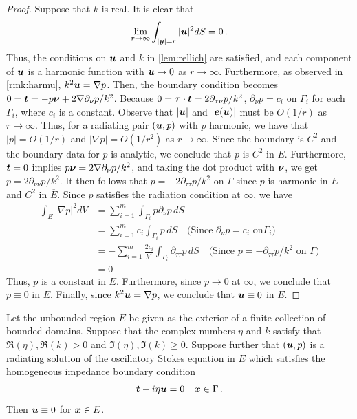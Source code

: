 \begin{proof}
Suppose that $k$ is real. It is clear that
\begin{equation}
\lim_{r\to\infty} \int_{|{\boldsymbol y}|=r} |{\boldsymbol u}|^2 dS = 0 \, . \nonumber
\end{equation}
Thus, the conditions on ${\boldsymbol u}$ and $k$ in \cref{lem:rellich}
are satisfied, and each component of ${\boldsymbol u}$ is a harmonic function
with ${\boldsymbol u} \to 0$ as $r \to \infty$. Furthermore, as observed
in \cref{rmk:harmu}, $k^2 {\boldsymbol u} = \nabla p$. Then, the boundary
condition becomes $0 = {\boldsymbol t} = -p {\boldsymbol \nu} + 2 \nabla \partial_\nu p/k^2$.
Because $0 = {\boldsymbol \tau} \cdot {\boldsymbol t} = 2\partial_{\tau\nu} p/k^2$,
$\partial_\nu p  = c_{i}$ on $\Gamma_{i}$ for each $\Gamma_{i}$,
where $c_{i}$ is a constant. 
Observe that $|{\boldsymbol u}|$ and $|{\boldsymbol e}({\boldsymbol u})|$ must be $O(1/r)$ as
$r\to\infty$. Thus,
for a radiating pair $({\boldsymbol u},p)$ with $p$ harmonic,
we have that $|p| = O(1/r)$ and $|\nabla p| = O(1/r^2)$
as $r\to\infty$.
Since the boundary is $C^{2}$ and the boundary data for $p$
is analytic, we conclude that $p$ is $C^{2}$ in
$\overline{E}$.
Furthermore, ${\boldsymbol t}=0$ implies $p {\boldsymbol \nu} = 2\nabla \partial_{\nu} p/k^2$, 
and taking the dot
product with ${\boldsymbol \nu}$, we get
$p = 2\partial_{\nu \nu}p/k^2$. 
It then follows that
$p = -2\partial_{\tau \tau}p/k^2$ on $\Gamma$ since 
$p$ is harmonic in $E$ and $C^{2}$ in $\overline{E}$. 
Since $p$ satisfies the radiation condition at $\infty$,
we have
\begin{equation}
\begin{aligned}
\int_{E} |\nabla p|^2 dV &= 
\sum_{i=1}^{m} \int_{\Gamma_{i}} p \partial_{\nu}p \,dS \\
&= \sum_{i=1}^{m} c_{i} \int_{\Gamma_{i}} p \,dS \quad \text{(Since $\partial_{\nu} p = c_{i}$ on
$\Gamma_{i}$)} \\ 
&= -\sum_{i=1}^{m} \frac{2c_{i}}{k^2} \int_{\Gamma_{i}} \partial_{\tau \tau} p \,dS 
\quad \text{(Since $p = -\partial_{\tau \tau}p/k^2$ on $\Gamma$)} \\
&= 0
\end{aligned}
\end{equation}
Thus, $p$ is a constant in $E$. Furthermore, since $p\to 0$ at $\infty$, 
we conclude that $p\equiv 0$ in $E$. 
Finally, since $k^2 {\boldsymbol u} = \nabla p$, we conclude that ${\boldsymbol u}\equiv 0$ in 
$E$.
\end{proof}

\begin{thrm}
  Let the unbounded region $E$ be given as the exterior
  of a finite collection of bounded domains.
  Suppose that the complex numbers $\eta$ and $k$ satisfy that
  $\Re(\eta), \Re(k) > 0$ and $\Im(\eta),\Im(k) \geq 0$.
  Suppose further that
  $({\boldsymbol u},p)$ is a radiating solution of the
  oscillatory Stokes equation in $E$ which satisfies
  the homogeneous impedance boundary condition
  \begin{equation}
{\boldsymbol t} - i \eta {\boldsymbol u} = 0 \quad {\boldsymbol x} \in \Gamma \, . \nonumber
\end{equation}
Then ${\boldsymbol u} \equiv 0$ for ${\boldsymbol x} \in E$.
\end{thrm}

